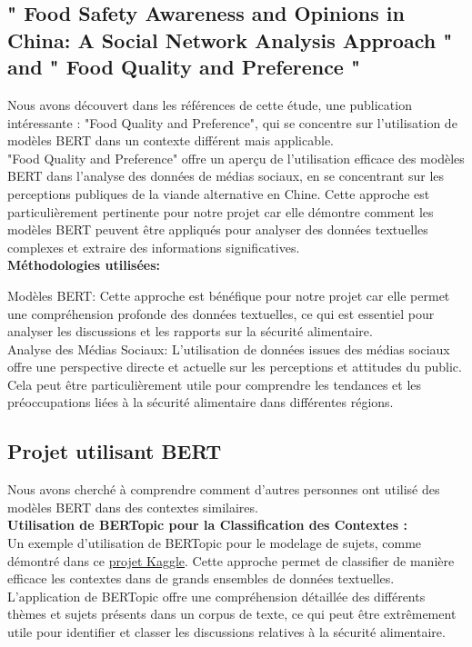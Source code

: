 \documentclass{article}
\begin{document}
\subsection{" Food Safety Awareness and Opinions in China: A Social Network Analysis Approach " and " Food Quality and Preference "}
Nous avons découvert dans les références de cette étude, une publication intéressante : "Food Quality and Preference", qui se concentre sur l'utilisation de modèles BERT dans un contexte différent mais applicable. \\

"Food Quality and Preference" offre un aperçu de l'utilisation efficace des modèles BERT dans l'analyse des données de médias sociaux, en se concentrant sur les perceptions publiques de la viande alternative en Chine. Cette approche est particulièrement pertinente pour notre projet car elle démontre comment les modèles BERT peuvent être appliqués pour analyser des données textuelles complexes et extraire des informations significatives. \\

\textbf{Méthodologies utilisées:}

Modèles BERT: Cette approche est bénéfique pour notre projet car elle permet une compréhension profonde des données textuelles, ce qui est essentiel pour analyser les discussions et les rapports sur la sécurité alimentaire. \\

Analyse des Médias Sociaux: L'utilisation de données issues des médias sociaux offre une perspective directe et actuelle sur les perceptions et attitudes du public. Cela peut être particulièrement utile pour comprendre les tendances et les préoccupations liées à la sécurité alimentaire dans différentes régions. \\

\subsection{Projet utilisant BERT}

Nous avons cherché à comprendre comment d'autres personnes ont utilisé des modèles BERT dans des contextes similaires. \\

\textbf{Utilisation de BERTopic pour la Classification des Contextes :} \\
Un exemple d'utilisation de BERTopic pour le modelage de sujets, comme démontré dans ce \href{https://www.kaggle.com/code/meetnagadia/topic-modeling-using-bertopic}{projet Kaggle}. Cette approche permet de classifier de manière efficace les contextes dans de grands ensembles de données textuelles. L'application de BERTopic offre une compréhension détaillée des différents thèmes et sujets présents dans un corpus de texte, ce qui peut être extrêmement utile pour identifier et classer les discussions relatives à la sécurité alimentaire.\\
\end{document}
